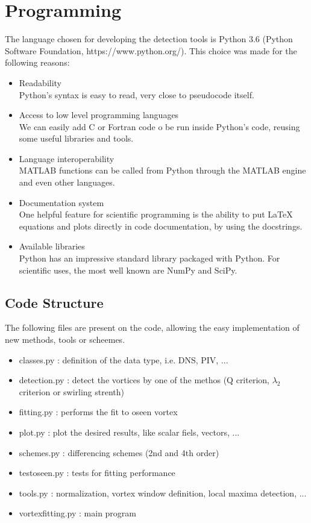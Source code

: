 \documentclass[12pt, a4paper, openany]{memoir}
\begin{document}
\section{Programming}

The language chosen for developing the detection tools is Python 3.6 (Python Software Foundation, https://www.python.org/). This choice was made for the following reasons:
\begin{itemize}
	\item Readability \\
	Python's syntax is easy to read, very close to pseudocode itself.
	\item Access to low level programming languages \\
	We can easily add C or Fortran code o be run inside Python's code, reusing some useful libraries and tools.
	\item Language interoperability \\
	MATLAB functions can be called from Python through the MATLAB engine and even other languages.
	\item Documentation system \\
	One helpful feature for scientific programming is the ability to put LaTeX equations and plots directly in code documentation, by using the docstrings.
	\item Available libraries \\
	Python has an impressive standard library packaged with Python. For scientific uses, the most well known are NumPy and SciPy.
\end{itemize} 

\subsection{Code Structure}

The following files are present on the code, allowing the easy implementation of new methods, tools or scheemes.

\begin{itemize}
	\item classes.py : definition of the data type, i.e. DNS, PIV, ...
	\item detection.py : detect the vortices by one of the methos (Q criterion, $\lambda_2$ criterion or swirling strenth)
	\item fitting.py : performs the fit to oseen vortex
	\item plot.py : plot the desired results, like scalar fiels, vectors, ...
	\item schemes.py : differencing schemes (2nd and 4th order)
	\item testoseen.py : tests for fitting performance
	\item tools.py : normalization, vortex window definition, local maxima detection, ... 
	\item vortexfitting.py : main program
\end{itemize}
\end{document}
